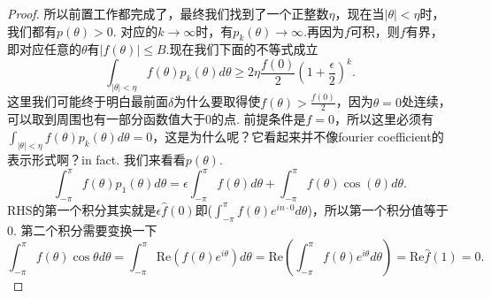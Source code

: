 \documentclass{article}
\begin{document}
\begin{proof}
所以前置工作都完成了，最终我们找到了一个正整数$\eta$，现在当$|\theta| < \eta$时，我们都有$p(\theta)>0$. 对应的$k \rightarrow \infty$时，有$p_k(\theta) \rightarrow \infty.$再因为$f$可积，则$f$有界，即对应任意的$\theta$有$|f(\theta)|\leq B$.现在我们下面的不等式成立
$$
\int_{|\theta| < \eta} f(\theta)p_k(\theta)d\theta \geq 2\eta\frac{f(0)}{2}(1+\frac{\epsilon}{2})^k.
$$
这里我们可能终于明白最前面$\delta$为什么要取得使$f(\theta) > \frac{f(0)}{2}$，因为$\theta=0$处连续，可以取到周围也有一部分函数值大于$0$的点. 前提条件是$\widehat{f}=0$，所以这里必须有$\int_{|\theta| < \eta} f(\theta)p_k(\theta)d\theta = 0$，这是为什么呢？它看起来并不像fourier coefficient的表示形式啊？in fact. 我们来看看$p(\theta)$.
$$
\int_{-\pi}^\pi f(\theta)p_1(\theta) d\theta = \epsilon\int_{-\pi}^\pi f(\theta) d\theta + \int_{-\pi}^\pi f(\theta)\cos(\theta) d\theta .
$$
RHS的第一个积分其实就是$\epsilon \widehat{f}(0)$即($\int_{-\pi}^\pi f(\theta)e^{in\cdot0} d\theta$)，所以第一个积分值等于$0$. 第二个积分需要变换一下
$$
\int_{-\pi}^\pi f(\theta)\cos\theta d\theta = \int_{-\pi}^\pi \text{Re}(f(\theta)e^{i\theta} )d\theta = \text{Re}\left(\int_{-\pi}^\pi f(\theta)e^{i\theta} d\theta\right) = \text{Re}\hat{f}(1) = 0.
$$







\end{proof}
\end{document}
